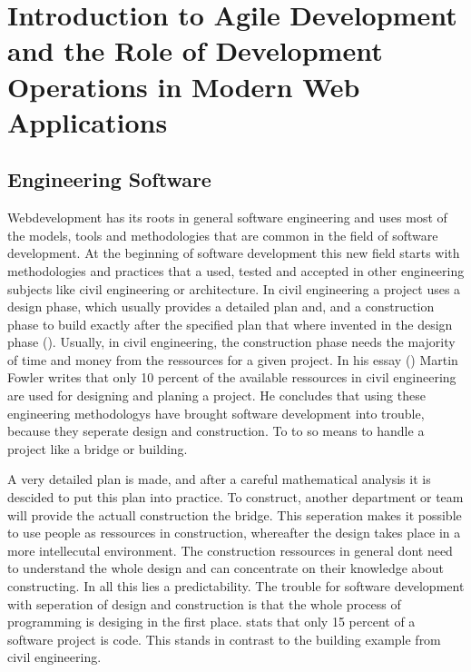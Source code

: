 \newpage

\section{Introduction to Agile Development and the Role of Development Operations in Modern Web Applications}
\label{section:Introduction to Agile Development and the Role of Development Operations in Modern Web Applications}

\subsection{Engineering Software}
Webdevelopment has its roots in general software engineering and uses most of the models, tools and methodologies that are
common in the field of software development. At the beginning of software development this new field starts with methodologies
and practices that a used, tested and accepted in other engineering subjects like civil engineering or architecture. In civil engineering
a project uses a design phase, which usually provides a detailed plan and, and a construction phase to build exactly after the specified
plan that where invented in the design phase (\cite{lindstrom2004extreme}). Usually, in civil engineering, the construction phase
needs the majority of time and money from the ressources for a given project. In his essay (\cite{fowler2001new}) Martin Fowler writes
that only 10 percent of the available ressources in civil engineering are used for designing and planing a project.
He concludes that using these engineering methodologys have brought software development into trouble, because they seperate design and
construction. To to so means to handle a project like a bridge or building.

A very detailed plan is made, and after a careful mathematical analysis it is descided to put this plan into practice. To construct,
another department or team will provide the actuall construction the bridge.
This seperation makes it possible to use people as ressources in construction, whereafter the design takes place in a more
intellecutal environment. The construction ressources in general dont need to understand the whole design and can concentrate on their
knowledge about constructing. In all this lies a predictability. The trouble for software development with seperation of design and
construction is that the whole process of programming is desiging in the first place. \cite{opac-b1105529} stats that only 15 percent of
a software project is code. This stands in contrast to the building example from civil engineering.

